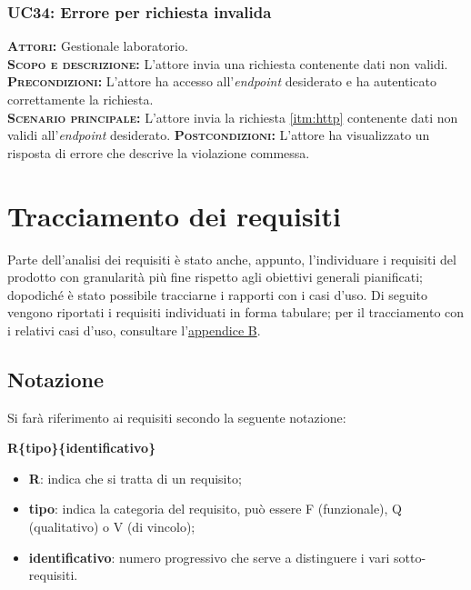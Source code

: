 \subsubsection{UC34: Errore per richiesta invalida}
\label{sec:UC34}
\textsc{\textbf{Attori:}} Gestionale laboratorio.\\
\textsc{\textbf{Scopo e descrizione:}} L'attore invia una richiesta contenente dati non validi.\\
\textsc{\textsc{\textbf{Precondizioni:}}} L'attore ha accesso all'\textit{endpoint} desiderato e ha autenticato correttamente la richiesta.\\
\textsc{\textbf{Scenario principale:}} L'attore invia la richiesta \ref{itm:http} contenente dati non validi all'\textit{endpoint} desiderato.
\textsc{\textbf{Postcondizioni:}} L'attore ha visualizzato un risposta di errore che descrive la violazione commessa.

\setlength{\parindent}{12pt}

\setlength{\parindent}{12pt}

\section{Tracciamento dei requisiti}
Parte dell'analisi dei requisiti è stato anche, appunto, l'individuare i requisiti del prodotto con granularità più fine rispetto agli obiettivi generali pianificati; dopodiché è stato possibile tracciarne i rapporti con i casi d'uso.
Di seguito vengono riportati i requisiti individuati in forma tabulare; per il tracciamento con i relativi casi d'uso, consultare l'\hyperref[sec:AppendixB]{appendice B}.
\subsection{Notazione}
Si farà riferimento ai requisiti secondo la seguente notazione:\\
\centerline{\textbf{R\{tipo\}\{identificativo\}}}
\begin{itemize}
    \item \textbf{R}: indica che si tratta di un requisito;
    \item \textbf{tipo}: indica la categoria del requisito, può essere F (funzionale), Q (qualitativo) o V (di vincolo);
    \item \textbf{identificativo}: numero progressivo che serve a distinguere i vari sotto-requisiti.
\end{itemize}
